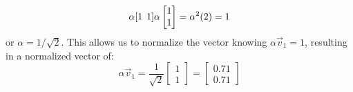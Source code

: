 \documentclass[12pt,letter]{article}
\begin{document}
\begin{example}
	\begin{equation}
	\alpha [1 \hspace{1ex} 1]\alpha  \begin{bmatrix} 1 \\  1 \end{bmatrix}  = \alpha^2(2) = 1
	\end{equation}
	or $\alpha = 1/\sqrt{2}$. This allows us to normalize the vector knowing $\alpha \vec{v}_1=1$, resulting in a normalized vector of:
	\begin{equation}
	\alpha \vec{v}_1=  \frac{1}{\sqrt{2}} \begin{bmatrix} 1 \\ 1 \end{bmatrix}  =  \begin{bmatrix} 0.71 \\ 0.71 \end{bmatrix} 
	\end{equation} 
	

\end{example}
\end{document}
